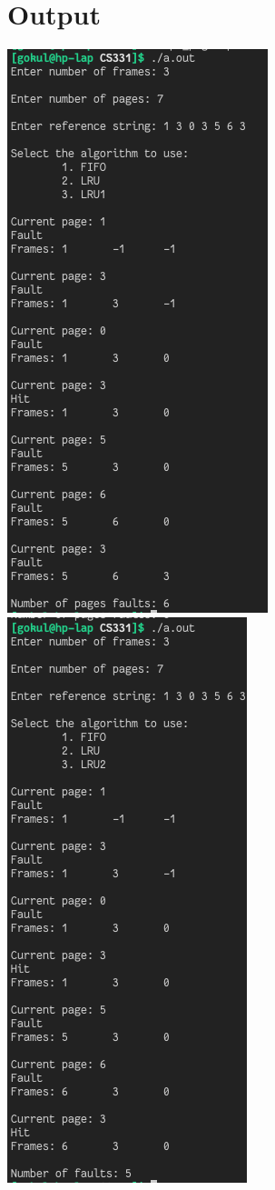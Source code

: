 \documentclass[13pt,oneside]{book}
\begin{document}
    \section*{Output}
    \includegraphics[]{img/p3/ss1.png} \\
    \includegraphics[]{img/p3/ss2.png} \\
\end{document}
